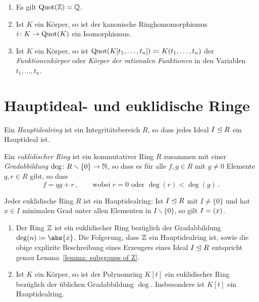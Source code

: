 \begin{example}
  \begin{enumerate}
    \item
      Es gilt $\operatorname{Quot}(\mathbb{Z}) = \mathbb{Q}$.
    \item
      Ist $K$ ein Körper, so ist der kanonische Ringhomomorphismus $i \colon K \to \operatorname{Quot}(K)$ ein Isomorphismus.
    \item
      Ist $K$ ein Körper, so ist $\operatorname{Quot}(K[t_1, \dotsc, t_n]) \eqqcolon K(t_1, \dotsc, t_n)$ der \emph{Funktionenkörper} oder \emph{Körper der rationalen Funktionen} in den Variablen $t_1, \dotsc, t_n$.
  \end{enumerate}
\end{example}





\section{Hauptideal- und euklidische Ringe}

\begin{definition}
  Ein \emph{Hauptidealring} ist ein Integritätsbereich $R$, so dass jedes Ideal $I \mathrel{\trianglelefteq} R$ ein Hauptideal ist.
\end{definition}

\begin{definition}
  Ein \emph{euklidischer Ring} ist ein kommutativer Ring $R$ zusammen mit einer \emph{Gradabbildung} $\deg \colon R \smallsetminus \{0\} \to \mathbb{N}$, so dass es für alle $f, g \in R$ mit $g \neq 0$ Elemente $q, r \in R$ gibt, so dass
  \[
    f = qg + r \,,
    \qquad
    \text{wobei $r = 0$ oder $\deg(r) < \deg(g)$} \,.
  \]
\end{definition}

\begin{lemma}
  Jeder euklidische Ring $R$ ist ein Hauptidealring:
  Ist $I \mathrel{\trianglelefteq} R$ mit $I \neq \{0\}$ und hat $x \in I$ minimalen Grad unter allen Elementen in $I \smallsetminus \{0\}$, so gilt $I = (x)$.
\end{lemma}

\begin{example}
  \begin{enumerate}
    \item
      Der Ring $\mathbb{Z}$ ist ein euklidischer Ring bezüglich der Gradabbildung $\deg(n) \defined \abs{x}$.
      Die Folgerung, dass $\mathbb{Z}$ ein Hauptidealring ist, sowie die obige explizite Beschreibung eines Erzeugers eines Ideal $I \mathrel{\trianglelefteq} R$ entspricht genau Lemma~\ref{lemma: subgroups of Z}.
    \item
      Ist $K$ ein Körper, so ist der Polynomring $K[t]$ ein euklidischer Ring bezüglich der üblichen Gradabbildung $\deg$.
      Insbesondere ist $K[t]$ ein Hauptidealring.
  \end{enumerate}
\end{example}

